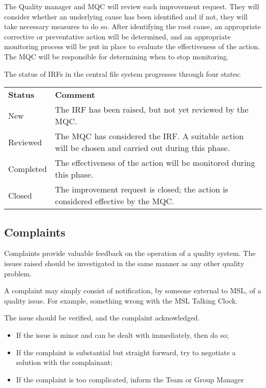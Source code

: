 The Quality manager and MQC will review each improvement request. They will consider whether an underlying cause has been identified and if not, they will take necessary measures to do so. After identifying the root cause, an appropriate corrective or preventative action will be determined, and an appropriate monitoring process will be put in place to evaluate the effectiveness of the action.  The MQC will be responsible for determining when to stop monitoring.

The status of IRFs in the central file system progresses through four states:
\begin{center}
{\renewcommand*{\arraystretch}{1.4}
\begin{tabular}{p{14.07em}p{25em}}
	\rowcolor[rgb]{ 0,  0,  0} 
	\textcolor[rgb]{ 1,  1,  1}{\textbf{Status}} & 
	\textcolor[rgb]{ 1,  1,  1}{\textbf{Comment}} \\
New & The IRF has been raised, but not yet reviewed by the MQC. \\ 
Reviewed & The MQC has considered the IRF. A suitable action will be chosen and carried out during this phase. \\ 
Completed & The effectiveness of the action will be monitored during this phase. \\ 
Closed & The improvement request is closed; the action is considered effective by the MQC. \\ 
\hline 
\end{tabular} 
}
\end{center}

\subsection{Complaints}
\label{ss:complaints}
Complaints provide valuable feedback on the operation of a quality system. The issues raised should be investigated in the same manner as any other quality problem. 

A complaint may simply consist of notification, by someone external to MSL, of a quality issue. For example, something wrong with the MSL Talking Clock. 

The issue should be verified, and the complaint acknowledged.
\begin{itemize}
\item If the issue is minor and can be dealt with immediately, then do so;
\item If the complaint is substantial but straight forward, try to negotiate a solution with the complainant;
\item If the complaint is too complicated, inform the Team or Group Manager
\end{itemize}

